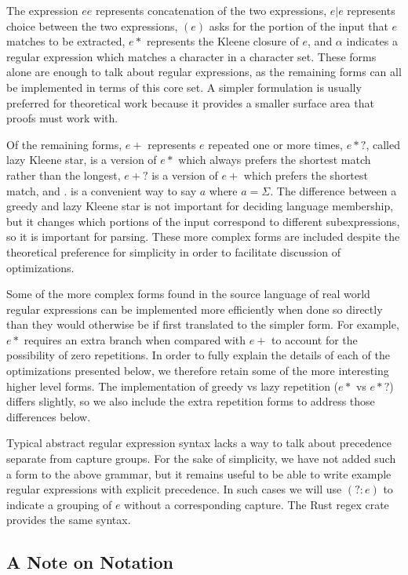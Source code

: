 The expression $e e$ represents concatenation of the two expressions,
$e|e$ represents choice between the two expressions, $(e)$ asks for the
portion of the input that $e$ matches to be extracted,
$e*$ represents the Kleene closure of $e$,
and $\alpha$ indicates a regular expression which matches a character
in a character set. These forms alone are enough to talk about regular
expressions, as the remaining forms can all be implemented in terms of this
core set. A simpler formulation is usually preferred for theoretical work
because it provides a smaller surface area that proofs must work with. 

Of the remaining forms, $e+$ represents $e$ repeated one or more times,
$e*?$, called lazy Kleene star, is a version of $e*$ which always prefers
the shortest match rather than the longest, $e+?$ is a version of
$e+$ which prefers the shortest match, and $.$ is a convenient
way to say $a$ where $a = \Sigma$. The difference between a greedy
and lazy Kleene star is not important for deciding language membership,
but it changes which portions of the input correspond to different
subexpressions, so it is important for parsing.
These more complex forms are included despite the theoretical preference
for simplicity in order to facilitate discussion of optimizations.

Some of the more complex forms found in the source language of real
world regular expressions can be implemented more efficiently 
when done so directly
than they would otherwise be if first translated to the
simpler form. For example, $e*$ requires an extra branch when compared
with $e+$ to account for the possibility of zero repetitions.
In order to fully explain the details of each of the
optimizations presented below, we therefore retain some of the more
interesting higher level forms. The implementation of greedy vs lazy
repetition ($e*$ vs $e*?$) differs slightly, so we also include the
extra repetition forms to address those differences below.

Typical abstract regular expression syntax lacks a way to talk about
precedence separate from capture groups. For the sake of simplicity,
we have not added such a form to the above grammar, but it remains
useful to be able to write example regular expressions with explicit
precedence. In such cases we will use $(?:e)$ to indicate a grouping
of $e$ without a corresponding capture. The Rust regex crate
provides the same syntax.

\subsection{A Note on Notation}

